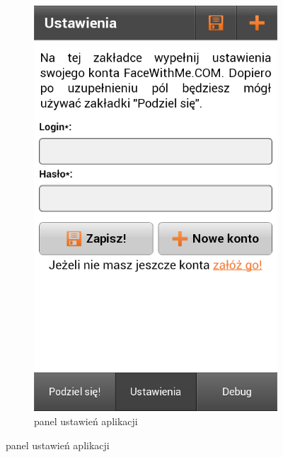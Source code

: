 \begin{figure}[h]
\begin{subfigure}[b]{0.3\textwidth}
                \includegraphics[width=\textwidth]{img/screens/mobile_broadcaster/panel-ustawien.png}
                \caption{panel ustawień aplikacji}
        \end{subfigure}
\end{figure}

